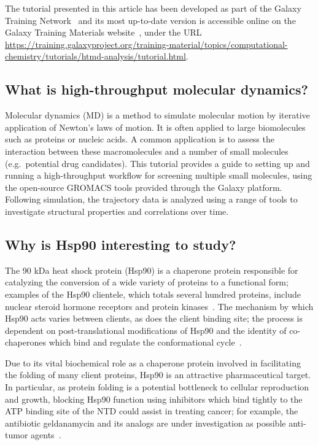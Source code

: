 \documentclass[twocolumn]{bmcart}%
\begin{document}
The tutorial presented in this article has been developed as part of the Galaxy Training Network~\cite{Batut2018} and its most up-to-date version is accessible online on the Galaxy Training Materials website~\cite{gtn_comp}, under the URL \url{https://training.galaxyproject.org/training-material/topics/computational-chemistry/tutorials/htmd-analysis/tutorial.html}.

\subsection*{What is high-throughput molecular
dynamics?}\label{what-is-high-throughput-molecular-dynamics}

Molecular dynamics (MD) is a method to simulate molecular motion by
iterative application of Newton's laws of motion. It is often applied to
large biomolecules such as proteins or nucleic acids. A common
application is to assess the interaction between these macromolecules
and a number of small molecules (e.g.~potential drug candidates). This
tutorial provides a guide to setting up and running a high-throughput
workflow for screening multiple small molecules, using the open-source
GROMACS tools provided through the Galaxy platform. Following simulation, the trajectory data is analyzed using a range of tools to investigate structural properties and correlations over time.


\subsection*{Why is Hsp90 interesting to
study?}\label{why-is-hsp90-interesting-to-study}

The 90 kDa heat shock protein (Hsp90) is a chaperone protein responsible
for catalyzing the conversion of a wide variety of proteins to a
functional form; examples of the Hsp90 clientele, which totals several
hundred proteins, include nuclear steroid hormone receptors and protein
kinases~\cite{Pearl2006}. The mechanism by which Hsp90 acts varies between clients, as
does the client binding site; the process is dependent on
post-translational modifications of Hsp90 and the identity of
co-chaperones which bind and regulate the conformational cycle~\cite{Schopf2017}.

Due to its vital biochemical role as a chaperone protein involved in
facilitating the folding of many client proteins, Hsp90 is an attractive
pharmaceutical target. In particular, as protein folding is a potential
bottleneck to cellular reproduction and growth, blocking Hsp90
function using inhibitors which bind tightly to the ATP binding site of the NTD
could assist in treating cancer; for example, the antibiotic
geldanamycin and its analogs are under investigation as possible
anti-tumor agents~\cite{Stebbins1997,Hermane2019}.
\end{document}
